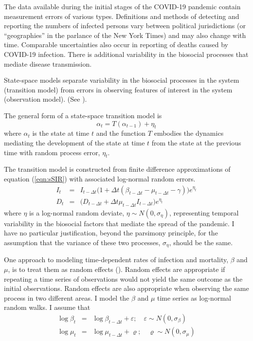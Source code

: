 \documentclass[12pt,letterpaper]{article}
\begin{document}
The data available during the initial stages of the COVID-19 pandemic
contain measurement errors of various types.
Definitions and methods of detecting and reporting the numbers of
infected persons vary between political jurisdictions (or
``geographies'' in the parlance of the New York Times) and may also
change with time.
Comparable uncertainties also occur in reporting of deaths caused
by COVID-19 infection.
There is additional variability in the biosocial
processes that mediate disease transmission.

State-space models separate variability in the biosocial
processes in the system (transition model)
from errors in observing features of interest
in the system (observation model).
(See \cite{Harvey1990}).

The general form of a state-space transition model is
\begin{equation}
\alpha_t=T(\alpha_{t-1}) + \eta_t
\end{equation}
where $\alpha_t$ is the state at time $t$ and 
the function $T$ embodies the dynamics mediating the
development of the state at time $t$ from the state at the previous
time with random process error, $\eta_t$.

The transition model is constructed from finite difference
approximations of equation (\ref{eqn:sSIR}) with associated log-normal
random errors.
\begin{eqnarray}
\label{eqn:sSIRfd}
I_t &=& I_{t-\Delta t}\big(1+\Delta t(\beta_{t-\Delta t} - \mu_{t-\Delta t}
- \gamma)\big)e^{\eta_t}\\
D_t &=& \big(D_{t-\Delta t} + \Delta t \mu_{t-\Delta t}I_{t-\Delta
t}\big)e^{\eta_t}
\end{eqnarray}
where $\eta$ is a log-normal random deviate, $\eta\sim
N(0,\sigma_\eta)$, representing temporal variability in the biosocial
factors that mediate the spread of the pandemic. I have no particular
justification, beyond the parsimony principle, for the assumption that
the variance of these two processes, $\sigma_\eta$, should be the
same.

One approach to modeling time-dependent rates of infection and
mortality, $\beta$ and $\mu$, is to treat them as random effects
(\cite{Skaug2006}). Random effects are appropriate if repeating a time
series of observations would not yield the same outcome as the initial
observations. Random effects are also appropriate when observing
the same process in two different areas. I model the  $\beta$ and
$\mu$ time series as log-normal random walks. I assume that
\begin{eqnarray}
\log\beta_t &=& \log\beta_{t-\Delta t}+\varepsilon;\quad \varepsilon\sim 
N(0,\sigma_\beta)\\
\log\mu_t &=& \log\mu_{t-\Delta t}+\varrho;\quad \varrho\sim
N(0,\sigma_\mu)
\end{eqnarray}
\end{document}
